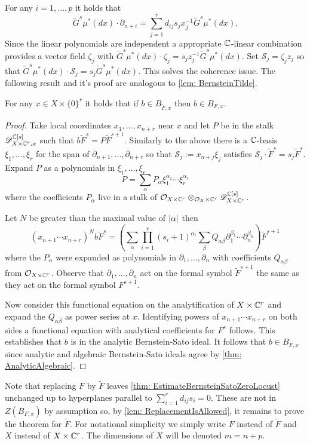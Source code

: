 For any $i=1,\ldots,p$ it holds that
$$\widetilde{G}^s \mu^*(dx)\cdot \partial_{n+i} = \sum_{j=1}^r d_{ij}s_j x_j^{-1} \widetilde{G}^s \mu^*(dx).$$
Since the linear polynomials are independent a appropriate $\mathbb{C}$-linear combination provides a vector field $\zeta_j$ with $\widetilde{G}^s \mu^*(dx)\cdot \zeta_j = s_{j}z_j^{-1}\widetilde{G}^s \mu^*(dx)$.
Set $\mathcal{S}_j = \zeta_jz_j$ so that $\widetilde{G}^s \mu^*(dx) \cdot \mathcal{S}_j = s_j \widetilde{G}^s \mu^*(dx) $.
This solves the coherence issue.
The following result and it's proof are analogous to \cref{lem: BernsteinTilde}.
\begin{lemma}\label{lem: ReplacementIsAllowed}
  For any $x\in X\times \{0\}^r$ it holds that if $b\in B_{\widetilde{F},x}$ then $b \in B_{F,x}$.
\end{lemma}
\begin{proof}
  Take local coordinates $x_1,\ldots, x_{n+r}$ near $x$ and let $P$ be in the stalk $\mathscr{D}_{X\times \mathbb{C}^r,x}^{\mathbb{C}[s]}$ such that $b \widetilde{F}^s = P \widetilde{F}^{s+1}$.
  Similarly to the above there is a $\mathbb{C}$-basis $\xi_1,\ldots,\xi_r$ for the span of $\partial_{n+1}, \ldots, \partial_{n+r}$ so that $\mathcal{S}_j := x_{n+j}\xi_j$ satisfies $\mathcal{S}_j \cdot \widetilde{F}^s = s_{j}\widetilde{F}^s$.
  Expand $P$ as a polynomials in $\xi_1,\ldots,\xi_r$
  $$P = \sum_{\alpha} P_\alpha \xi_{1}^{\alpha_1}\cdots \xi_{r}^{\alpha_r}$$
  where the coefficients $P_\alpha$ live in a stalk of $\mathcal{O}_{X\times \mathbb{C}^r}\otimes_{\mathcal{O}_X\times \mathbb{C}^r}\mathscr{D}_{X\times \mathbb{C}^r}^{\mathbb{C}[s]}$.

  Let $N$ be greater than the maximal value of $\vert \alpha \vert$ then
  $$(x_{n+1}\cdots x_{n+r})^N b \widetilde{F}^s = \left(\sum_{\alpha} \prod_{i=1}^r (s_i + 1)^{\alpha_i} \sum_\beta Q_{\alpha\beta} \partial_1^{\beta_1}\cdots \partial_n^{\beta_n} \right)\widetilde{F}^{s+1}$$
  where the $P_\alpha$ were expanded as polynomials in $\partial_1,\ldots,\partial_n$ with coefficients $Q_{\alpha\beta}$ from $\mathcal{O}_{X\times \mathbb{C}^r}$.
  Observe that $\partial_1,\ldots, \partial_n$ act on the formal symbol $\widetilde{F}^{s+1}$ the same as they act on the formal symbol $F^{s+1}$.

  Now consider this functional equation on the analytification of $X\times \mathbb{C}^r$ and expand the $Q_{\alpha\beta}$ as power series at $x$.
  Identifying powers of $x_{n+1}\cdots x_{n+r}$ on both sides a functional equation with analytical coefficients for $F^s$ follows.
  This establishes that $b$ is in the analytic Bernstein-Sato ideal.
  It follows that $ b\in B_{F,x}$ since analytic and algebraic Bernstein-Sato ideals agree by \cref{thm: AnalyticAlgebraic}.
\end{proof}
Note that replacing $F$ by $\widetilde{F}$ leaves \cref{thm: EstimateBernsteinSatoZeroLocust} unchanged up to hyperplanes parallel to $\sum_{i=1}^r d_{ij}s_i = 0$.
These are not in $Z(B_{F,x})$ by assumption so, by \cref{lem: ReplacementIsAllowed}, it remains to prove the theorem for $\widetilde{F}$.
For notational simplicity we simply write $F$ instead of $\widetilde{F}$ and $X$ instead of $X\times \mathbb{C}^r$.
The dimensions of $X$ will be denoted $m = n+p$.

